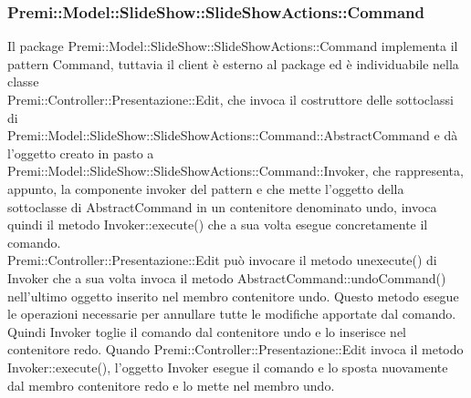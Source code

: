 {{		\subsubsection{Premi::Model::SlideShow::SlideShowActions::Command}{
			Il package Premi::Model::SlideShow::SlideShowActions::Command implementa il pattern Command, tuttavia il client è esterno al package ed è individuabile nella classe\\ Premi::Controller::Presentazione::Edit, che invoca il costruttore delle sottoclassi di\\ Premi::Model::SlideShow::SlideShowActions::Command::AbstractCommand e dà l'oggetto creato in pasto a Premi::Model::SlideShow::SlideShowActions::Command::Invoker, che rappresenta, appunto, la componente invoker del pattern e che mette l'oggetto della sottoclasse di AbstractCommand in un contenitore denominato undo, invoca quindi il metodo Invoker::execute() che a sua volta esegue concretamente il comando.\\
			Premi::Controller::Presentazione::Edit può invocare il metodo unexecute() di Invoker che a sua volta invoca il metodo AbstractCommand::undoCommand() nell'ultimo oggetto inserito nel membro contenitore undo. Questo metodo esegue le operazioni necessarie per annullare tutte le modifiche apportate dal comando. Quindi Invoker toglie il comando dal contenitore undo e lo inserisce nel contenitore redo. Quando Premi::Controller::Presentazione::Edit invoca il metodo Invoker::execute(), l'oggetto Invoker esegue il comando e lo sposta nuovamente dal membro contenitore redo e lo mette nel membro undo.    
		}
	}
}